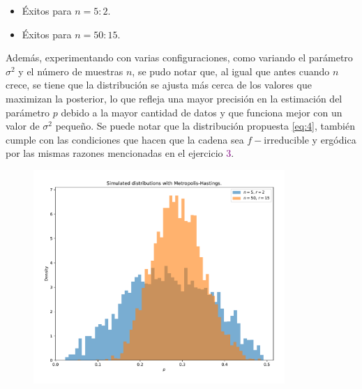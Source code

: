 \begin{itemize}
	\item Éxitos para $n = 5: 2$.
	\item Éxitos para $n = 50: 15$.
\end{itemize}

Además, experimentando con varias configuraciones, como variando el parámetro $\sigma^2$ y el número de muestras $n$, se pudo notar que, al igual que antes cuando $n$ crece, se tiene que la distribución se ajusta más cerca de los valores que maximizan la posterior, lo que refleja una mayor precisión en la estimación del parámetro $p$ debido a la mayor cantidad de datos y que funciona mejor con un valor de $\sigma^2$ pequeño. Se puede notar que la distribución propuesta \eqref{eq:4}, también cumple con las condiciones que hacen que la cadena sea $f-$irreducible y ergódica por las mismas razones mencionadas en el ejercicio \textcolor{Purple}{3}.
\begin{figure}[h!]
	\centering
	\includegraphics[width=0.85\textwidth]{IMAGENES/MS_normal.pdf}
\end{figure}




